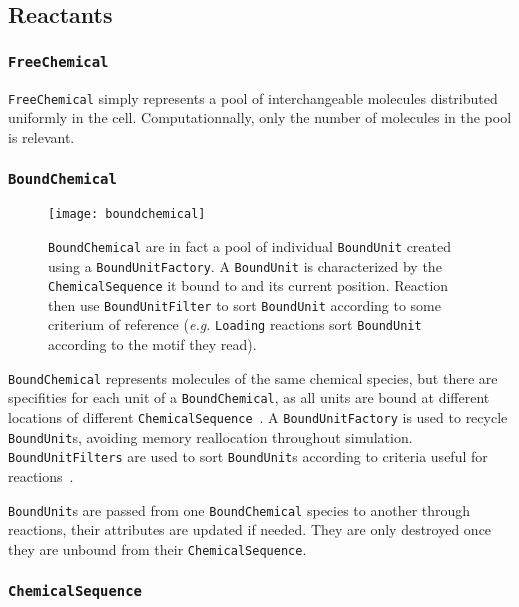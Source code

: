 
\subsection{Reactants}

\subsubsection{\texttt{FreeChemical}}

\texttt{FreeChemical} simply represents a pool of interchangeable molecules distributed uniformly in the cell. Computationnally, only the number of molecules in the pool is relevant.

\subsubsection{\texttt{BoundChemical}}

\begin{figure}[!h]
  \centering
  \texttt{[image: boundchemical]}
  \caption{\texttt{BoundChemical} are in fact a pool of individual \texttt{BoundUnit} created using a \texttt{BoundUnitFactory}. A \texttt{BoundUnit} is characterized by the \texttt{ChemicalSequence} it bound to and its current position. Reaction then use \texttt{BoundUnitFilter} to sort \texttt{BoundUnit} according to some criterium of reference (\textit{e.g.} \texttt{Loading} reactions sort \texttt{BoundUnit} according to the motif they read).}
  \label{fig:bound_chemical}
\end{figure}

\texttt{BoundChemical} represents molecules of the same chemical species, but there are specifities for each unit of a \texttt{BoundChemical}, as all units are bound at different locations of different \texttt{ChemicalSequence}~. A \texttt{BoundUnitFactory} is used to recycle \texttt{BoundUnit}s, avoiding memory reallocation throughout simulation. \texttt{BoundUnitFilters} are used to sort \texttt{BoundUnit}s according to criteria useful for reactions~.


\texttt{BoundUnit}s are passed from one \texttt{BoundChemical} species to another through reactions, their attributes are updated if needed. They are only destroyed once they are unbound from their \texttt{ChemicalSequence}.

\subsubsection{\texttt{ChemicalSequence}}

